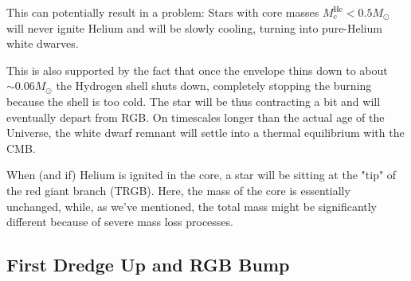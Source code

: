 \par This can potentially result in a problem: Stars with core masses $M_{c}^{\text{He}}<0.5M_{\odot}$ will never ignite Helium and will be slowly cooling, turning into pure-Helium white dwarves.
\par This is also supported by the fact that once the envelope thins down to about $\sim 0.06M_{\odot}$ the Hydrogen shell shuts down, completely stopping the burning because the shell is too cold. The star will be thus contracting a bit and will eventually depart from RGB. On timescales longer than the actual age of the Universe, the white dwarf remnant will settle into a thermal equilibrium with the CMB.
\par When (and if) Helium is ignited in the core, a star will be sitting at the "tip" of the red giant branch (TRGB). Here, the mass of the core is essentially unchanged, while, as we've mentioned, the total mass might be significantly different because of severe mass loss processes.

\subsection{First Dredge Up and RGB Bump}

